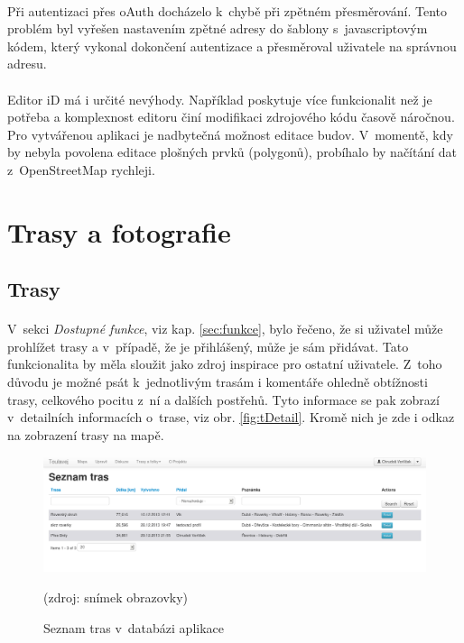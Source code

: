 \documentclass[11pt,a4paper,titlepage,oneside]{book}
\begin{document}
				\paragraph{} Při autentizaci přes oAuth docházelo k~chybě při zpětném přesměrování. Tento problém byl vyřešen nastavením zpětné adresy do šablony s~javascriptovým kódem, který vykonal dokončení autentizace a přesměroval uživatele na správnou adresu.

				\paragraph{} Editor iD má i určité nevýhody. Například poskytuje více funkcionalit než je potřeba a komplexnost editoru činí modifikaci zdrojového kódu časově náročnou. Pro vytvářenou aplikaci je nadbytečná možnost editace budov. V~momentě, kdy by nebyla povolena editace plošných prvků (polygonů), probíhalo by načítání dat z~OpenStreetMap rychleji. 



		\section{Trasy a fotografie}


			\subsection{Trasy}
			\paragraph{} V~sekci \textit{Dostupné funkce}, viz kap. \ref{sec:funkce}, bylo řečeno, že si uživatel může prohlížet trasy a v~případě, že je přihlášený, může je sám přidávat. Tato funkcionalita by měla sloužit jako zdroj inspirace pro ostatní uživatele. Z~toho důvodu je možné psát k~jednotlivým trasám i komentáře ohledně obtížnosti trasy, celkového pocitu z~ní a dalších postřehů. Tyto informace se pak zobrazí v~detailních informacích o~trase, viz obr. \ref{fig:tDetail}. Kromě nich je zde i odkaz na zobrazení trasy na mapě.
		\begin{figure}[!h]
			\begin{center}
				\includegraphics[width=12cm]{obrazky/toulavej/trackDefault.png}
				\caption{Seznam tras v~databázi aplikace }
				\label{fig:tDefault}
				(zdroj: snímek obrazovky)
			\end{center}
		\end{figure}	
\end{document}
